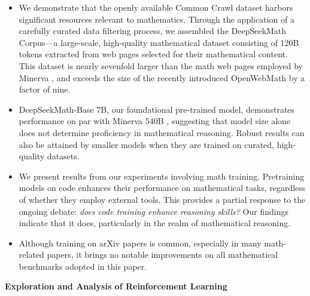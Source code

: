 \begin{itemize}[topsep=0pt]
    \item We demonstrate that the openly available Common Crawl dataset harbors significant resources relevant to mathematics. Through the application of a carefully curated data filtering process, we assembled the DeepSeekMath Corpus—a large-scale, high-quality mathematical dataset consisting of 120B tokens extracted from web pages selected for their mathematical content. This dataset is nearly sevenfold larger than the math web pages employed by Minerva \citep{minerva}, and exceeds the size of the recently introduced OpenWebMath \citep{openwebmath} by a factor of nine.

\item DeepSeekMath-Base 7B, our foundational pre-trained model, demonstrates performance on par with Minerva 540B \citep{minerva}, suggesting that model size alone does not determine proficiency in mathematical reasoning. Robust results can also be attained by smaller models when they are trained on curated, high-quality datasets.

\item We present results from our experiments involving math training. Pretraining models on code enhances their performance on mathematical tasks, regardless of whether they employ external tools. This provides a partial response to the ongoing debate: \textit{does code training enhance reasoning skills?} Our findings indicate that it does, particularly in the realm of mathematical reasoning.

    \item Although training on arXiv papers is common, especially in many math-related papers, it brings no notable improvements on all mathematical benchmarks adopted in this paper.
\end{itemize}

\textbf{Exploration and Analysis of Reinforcement Learning}

